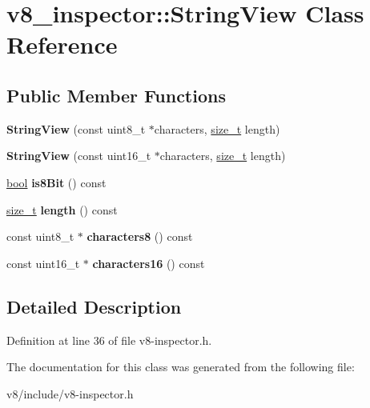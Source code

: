 \hypertarget{classv8__inspector_1_1StringView}{}\section{v8\+\_\+inspector\+:\+:String\+View Class Reference}
\label{classv8__inspector_1_1StringView}
\subsection*{Public Member Functions}
\begin{DoxyCompactItemize}
\item 
\mbox{\label{classv8__inspector_1_1StringView_aafc4d42555f35f95d6c2264432b89995}} 
{\bfseries String\+View} (const uint8\+\_\+t $\ast$characters, \mbox{\hyperlink{classsize__t}{size\+\_\+t}} length)
\item 
\mbox{\label{classv8__inspector_1_1StringView_acb0f9ca01c2e1d55e7f94e6b1421d76e}} 
{\bfseries String\+View} (const uint16\+\_\+t $\ast$characters, \mbox{\hyperlink{classsize__t}{size\+\_\+t}} length)
\item 
\mbox{\label{classv8__inspector_1_1StringView_ab2c2899bfa07d0bc745b8a01592a761a}} 
\mbox{\hyperlink{classbool}{bool}} {\bfseries is8\+Bit} () const
\item 
\mbox{\label{classv8__inspector_1_1StringView_a2e851af43b41d8af7978c8b2480cbb34}} 
\mbox{\hyperlink{classsize__t}{size\+\_\+t}} {\bfseries length} () const
\item 
\mbox{\label{classv8__inspector_1_1StringView_a5e5f5f3ec476455ebdf526cb26a468f7}} 
const uint8\+\_\+t $\ast$ {\bfseries characters8} () const
\item 
\mbox{\label{classv8__inspector_1_1StringView_abf54908b25a843c15f482328f5b1206f}} 
const uint16\+\_\+t $\ast$ {\bfseries characters16} () const
\end{DoxyCompactItemize}


\subsection{Detailed Description}


Definition at line 36 of file v8-\/inspector.\+h.



The documentation for this class was generated from the following file\+:\begin{DoxyCompactItemize}
\item 
v8/include/v8-\/inspector.\+h\end{DoxyCompactItemize}
